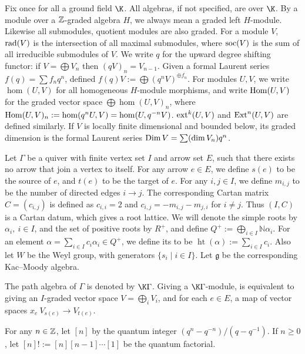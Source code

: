 \begin{convention}
    Fix once for all a ground field $\K$. All algebras, if not specified, are over $\K$.
    By a module over a $\mathbb{Z}$-graded algebra $H$, we always mean a graded left
    $H$-module. Likewise all submodules, quotient modules are also graded.
    For a module $V$, $\operatorname{rad}(V)$ is the intersection of all maximal submodules,
    where $\operatorname{soc}(V)$ is the sum of all irreducible submodules of $V$.
    We write $q$ for the upward degree shifting functor: if $V = \bigoplus V_n$
    then $(qV)_n = V_{n-1}$. Given a formal Laurent series $f(q) = \sum f_nq^n$,
    defined $f(q)V:= \bigoplus (q^nV)^{\oplus f_n}$. For modules $U,V$,
    we write $\hom(U,V)$ for all homogeneous $H$-module morphisms, and write
    $\operatorname{Hom}(U,V)$ for the graded vector space $\bigoplus\hom(U,V)_n$,
    where $\operatorname{Hom}(U,V)_n:= \hom(q^nU,V) = \hom(U,q^{-n}V)$. $\operatorname{ext}^k(U,V)$
    and $\operatorname{Ext}^n(U,V)$ are defined similarly. If $V$ is locally finite dimensional
    and bounded below, its graded dimension is the formal Laurent series
    $\operatorname{Dim} V = \sum(\dim V_n)q^n$.

    Let $\Gamma$ be a quiver with finite vertex set $I$
    and arrow set $E$, such that there exists no arrow
    that join a vertex to itself. For any arrow $e\in E$,
    we define $s(e)$ to be the source of $e$, and 
    $t(e)$ to be the target of $e$. For any $i,j\in I$, we define
    $m_{i,j}$ to be the number of directed edges $i\to j$. 
    The corresponding Cartan matrix $C = (c_{i,j})$ 
    is defined as $c_{i,i} = 2$ and $c_{i,j} = -m_{i,j}-m_{j,i}$ for $i\ne j$.
    Thus $(I,C)$ is a Cartan datum, which gives a root lattice.
    We will denote the simple roots by $\alpha_i,\ i\in I$, and the set of positive roots by
    $R^+$, and define $Q^+ := \bigoplus_{i\in I}\mathbb{N}\alpha_i$. For 
    an element $\alpha = \sum_{i\in I}c_i\alpha_i\in Q^+$, we define its 
    to be $\operatorname{ht}(\alpha) := \sum_{i\in I}c_i$. Also let $W$ be the Weyl group, with generators
    $\{s_i\mid i\in I\}$. Let $\mathfrak{g}$ be the corresponding Kac--Moody
    algebra.

    The path algebra of $\Gamma$ is denoted by $\K\Gamma$.
    Giving a $\K\Gamma$-module, is equivalent to giving an $I$-graded vector space
    $V = \bigoplus_i V_i$, and for each $e\in E$, a map of vector spaces $x_e\:V_{s(e)}\to V_{t(e)}$.

    For any $n\in\mathbb{Z}$, let $[n]$ by the quantum
    integer $(q^n-q^{-n})/(q-q^{-1})$. If $n\ge 0$, let $[n]! := [n][n-1]\cdots[1]$
    be the quantum factorial. 
\end{convention}

